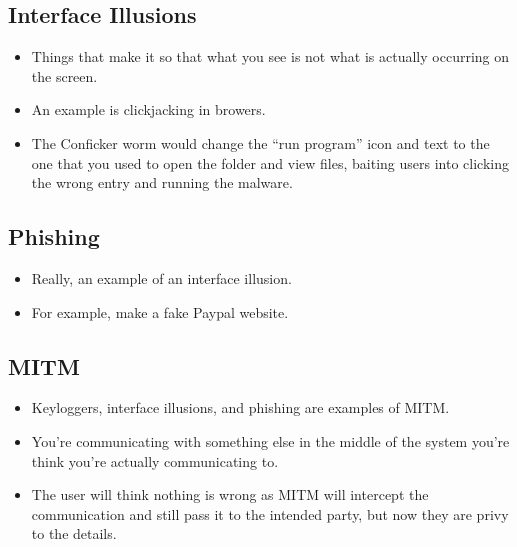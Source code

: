\documentclass{article}
\begin{document}
\subsection{Interface Illusions}
\begin{itemize}
    \item Things that make it so that what you see is not what is actually occurring on the screen.
    \item An example is clickjacking in browers.
    \item The Conficker worm would change the ``run program'' icon and text to the one that you used to open the folder and view files, baiting users into clicking the wrong entry and running the malware.
\end{itemize}


\subsection{Phishing}
\begin{itemize}
    \item Really, an example of an interface illusion.
    \item For example, make a fake Paypal website.
\end{itemize}

\subsection{MITM}
\begin{itemize}
    \item Keyloggers, interface illusions, and phishing are examples of MITM.
    \item You're communicating with something else in the middle of the system you're think you're actually communicating to.
    \item The user will think nothing is wrong as MITM will intercept the communication and still pass it to the intended party, but now they are privy to the details.
\end{itemize}
\end{document}
